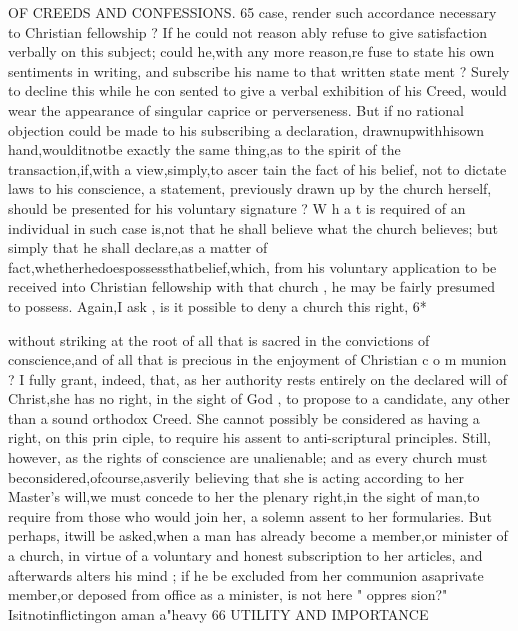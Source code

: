 \documentclass[
]{book}
\begin{document}
OF CREEDS AND CONFESSIONS. 65
case, render such accordance necessary to Christian fellowship ? If he could not reason
ably refuse to give satisfaction verbally on this subject; could he,with any more reason,re fuse to state his own sentiments in writing, and subscribe his name to that written state
ment ? Surely to decline this while he con sented to give a verbal exhibition of his Creed, would wear the appearance of singular caprice or perverseness. But if no rational objection could be made to his subscribing a declaration, drawnupwithhisown hand,woulditnotbe exactly the same thing,as to the spirit of the transaction,if,with a view,simply,to ascer tain the fact of his belief, not to dictate laws to his conscience, a statement, previously
drawn up by the church herself, should be presented for his voluntary signature ? W h a t is required of an individual in such case is,not that he shall believe what the church believes;
but simply that he shall declare,as a matter of fact,whetherhedoespossessthatbelief,which, from his voluntary application to be received into Christian fellowship with that church , he
may be fairly presumed to possess. Again,I ask , is it possible to deny a church this right,
6*

without striking at the root of all that is sacred in the convictions of conscience,and of all that
is precious in the enjoyment of Christian c o m munion ? I fully grant, indeed, that, as her authority rests entirely on the declared will of
Christ,she has no right, in the sight of God ,
to propose to a candidate, any other than a
sound orthodox Creed. She cannot possibly
be considered as having a right, on this prin
ciple, to require his assent to anti-scriptural
principles. Still, however, as the rights of conscience are unalienable; and as every
church must beconsidered,ofcourse,asverily
believing that she is acting according to her Master's will,we must concede to her the
plenary right,in the sight of man,to require from those who would join her, a solemn assent to her formularies.
But perhaps, itwill be asked,when a man has already become a member,or minister of a church, in virtue of a voluntary and honest subscription to her articles, and afterwards
alters his mind ; if he be excluded from her communion asaprivate member,or deposed
from office as a minister, is not here " oppres sion?" Isitnotinflictingon aman a"heavy
66 UTILITY AND IMPORTANCE
\end{document}
